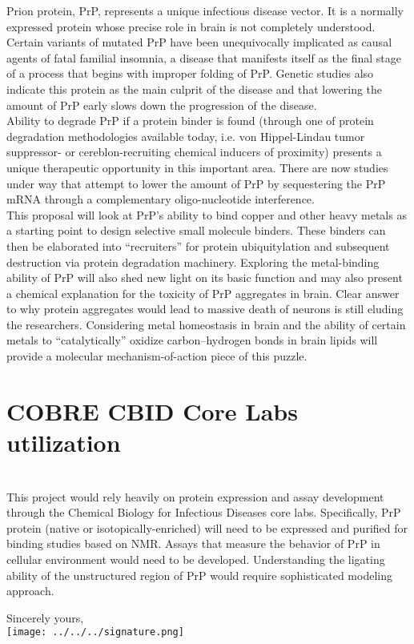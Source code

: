\documentclass{letter}
\begin{document}
\begin{letter}{}
Prion protein, PrP, represents a unique infectious disease vector. It is a normally expressed protein whose precise role in brain is not completely understood. Certain variants of mutated PrP have been unequivocally implicated as causal agents of fatal familial insomnia, a disease that manifests itself as the final stage of a process that begins with improper folding of PrP. Genetic studies also indicate this protein as the main culprit of the disease and that lowering the amount of PrP early slows down the progression of the disease. \\Ability to degrade PrP if a protein binder is found (through one of protein degradation methodologies available today, i.e. von Hippel-Lindau tumor suppressor- or cereblon-recruiting chemical inducers of proximity) presents a unique therapeutic opportunity in this important area. There are now studies under way that attempt to lower the amount of PrP by sequestering the PrP mRNA through a complementary oligo-nucleotide interference. \\
This proposal will look at PrP's ability to bind copper and other heavy metals as a starting point to design selective small molecule binders. These binders can then be elaborated into ``recruiters'' for protein ubiquitylation and subsequent destruction via protein degradation machinery. Exploring the metal-binding ability of PrP will also shed new light on its basic function and may also present a chemical explanation for the toxicity of PrP aggregates in brain. Clear answer to why protein aggregates would lead to massive death of neurons is still eluding the researchers. Considering metal homeostasis in brain and the ability of certain metals to ``catalytically'' oxidize carbon--hydrogen bonds in brain lipids will provide a molecular mechanism-of-action piece of this puzzle.\\
\section{COBRE CBID Core Labs utilization}\\
This project would rely heavily on protein expression and assay development through the Chemical Biology for Infectious Diseases core labs. Specifically, PrP protein (native or isotopically-enriched) will need to be expressed and purified for binding studies based on NMR. Assays that measure the behavior of PrP in cellular environment would need to be developed. Understanding the ligating ability of the unstructured region of PrP would require sophisticated modeling approach. \\
\vspace{0.25in}
\closing{Sincerely yours,\\
\texttt{[image: ../../../signature.png]}}

\end{letter}
 
\end{document}
